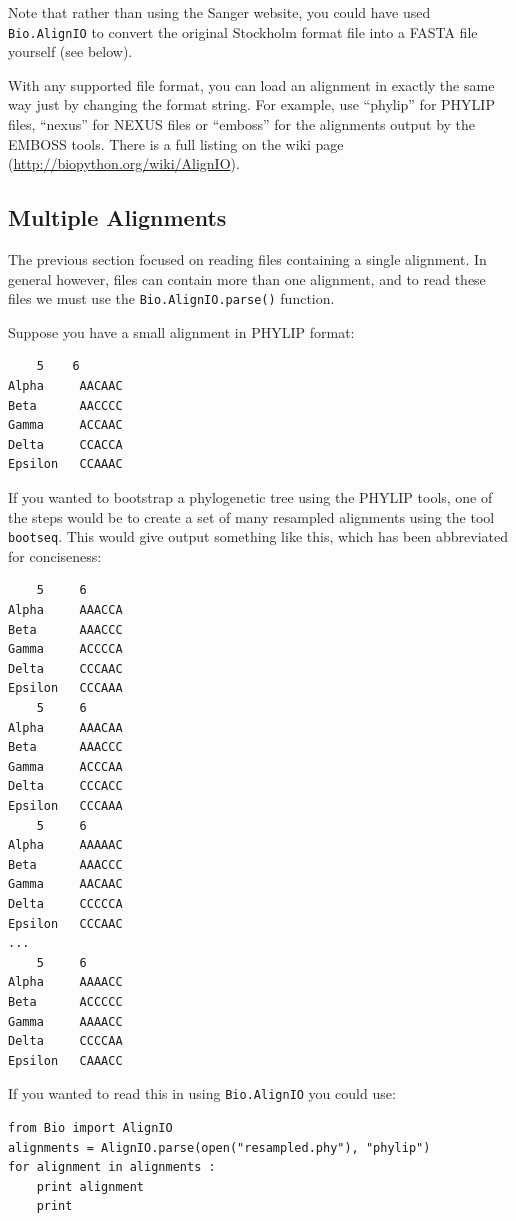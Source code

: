 \documentclass{report}
\begin{document}
Note that rather than using the Sanger website, you could have used \verb|Bio.AlignIO| to convert the original Stockholm format file into a FASTA file yourself (see below).

With any supported file format, you can load an alignment in exactly the same way just by changing the format string.  For example, use ``phylip'' for PHYLIP files, ``nexus'' for NEXUS files or ``emboss'' for the alignments output by the EMBOSS tools.  There is a full listing on the wiki page (\url{http://biopython.org/wiki/AlignIO}).

\subsection{Multiple Alignments}

The previous section focused on reading files containing a single alignment.  In general however, files can contain more than one alignment, and to read these files we must use the \verb|Bio.AlignIO.parse()| function.

Suppose you have a small alignment in PHYLIP format:

\begin{verbatim}
    5    6
Alpha     AACAAC
Beta      AACCCC
Gamma     ACCAAC
Delta     CCACCA
Epsilon   CCAAAC
\end{verbatim}

If you wanted to bootstrap a phylogenetic tree using the PHYLIP tools, one of the steps would be to create a set of many resampled alignments using the tool \verb|bootseq|.  This would give output something like this, which has been abbreviated for conciseness:

\begin{verbatim}
    5     6
Alpha     AAACCA
Beta      AAACCC
Gamma     ACCCCA
Delta     CCCAAC
Epsilon   CCCAAA
    5     6
Alpha     AAACAA
Beta      AAACCC
Gamma     ACCCAA
Delta     CCCACC
Epsilon   CCCAAA
    5     6
Alpha     AAAAAC
Beta      AAACCC
Gamma     AACAAC
Delta     CCCCCA
Epsilon   CCCAAC
...
    5     6
Alpha     AAAACC
Beta      ACCCCC
Gamma     AAAACC
Delta     CCCCAA
Epsilon   CAAACC
\end{verbatim}

If you wanted to read this in using \verb|Bio.AlignIO| you could use:

\begin{verbatim}
from Bio import AlignIO
alignments = AlignIO.parse(open("resampled.phy"), "phylip")
for alignment in alignments :
    print alignment
    print
\end{verbatim}
\end{document}
